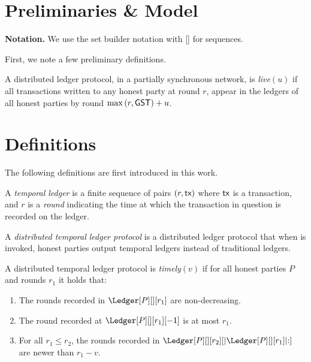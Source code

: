 \section{Preliminaries \& Model}

\textbf{Notation.}
We use the set builder notation with [] for sequences.


First, we note a few preliminary definitions.




\begin{definition}
  A distributed ledger protocol, in a partially synchronous network,
  is \emph{live}$(u)$ if all transactions written to any honest party
  at round $r$, appear in the ledgers of all honest parties by round %
  $\max{(r,\textsf{GST})} + u$.
\end{definition}


\section{Definitions}
The following definitions are first introduced in this work.

\begin{definition}
  A \emph{temporal ledger} is a finite sequence of pairs $(r, \textsf{tx})$ where $\textsf{tx}$ is
  a transaction, and $r$ is a \emph{round} indicating the time at which
  the transaction in question is recorded on the ledger.
\end{definition}

\begin{definition}
  A \emph{distributed temporal ledger protocol} is a distributed ledger protocol
  that when \rread is invoked, honest parties output temporal ledgers instead of traditional ledgers.
\end{definition}

\begin{definition}[Timely]\label{def:timely}
  A distributed temporal ledger protocol is \emph{timely}$(v)$
  if for all honest parties $P$ and rounds $r_1$ it holds that:

  \begin{enumerate}
    \item The rounds recorded in $\Ledger[P][][r_1]$ are non-decreasing.\label{def:timely-increasing}
    \item The round recorded at $\Ledger[P][][r_1][-1]$ is at most $r_1$.\label{def:timely-past}
    \item For all $r_1 \leq r_2$, the rounds recorded in $\Ledger[P][][r_2][|\Ledger[P][][r_1]|{:}]$ are
          newer than $r_1 - v$.\label{def:timely-chunk}
  \end{enumerate}
\end{definition}

